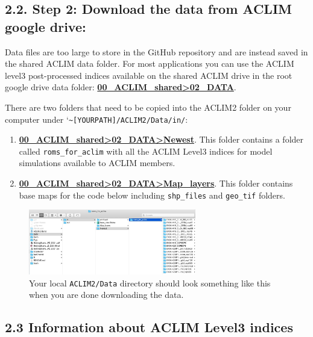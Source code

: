 \documentclass[
]{article}
\begin{document}
\hypertarget{step-2-download-the-data-from-aclim-google-drive}{%
\subsection{2.2. Step 2: Download the data from ACLIM google
drive:}\label{step-2-download-the-data-from-aclim-google-drive}}

Data files are too large to store in the GitHub repository and are
instead saved in the shared ACLIM data folder. For most applications you
can use the ACLIM level3 post-processed indices available on the shared
ACLIM drive in the root google drive data folder:
\href{https://drive.google.com/drive/u/0/folders/0Bx7wdZllbuF9eDJndkhCS2EwQUk}{\textbf{00\_ACLIM\_shared\textgreater02\_DATA}}.

There are two folders that need to be copied into the ACLIM2 folder on
your computer under
`\texttt{\textasciitilde{}{[}YOURPATH{]}/ACLIM2/Data/in/}:

\begin{enumerate}
\def\labelenumi{\arabic{enumi})}
\item
  \href{https://drive.google.com/drive/u/0/folders/0Bx7wdZllbuF9eDJndkhCS2EwQUk}{\textbf{00\_ACLIM\_shared\textgreater02\_DATA\textgreater Newest}}.
  This folder contains a folder called \texttt{roms\_for\_aclim} with
  all the ACLIM Level3 indices for model simulations available to ACLIM
  members.
\item
  \href{https://drive.google.com/drive/u/0/folders/0Bx7wdZllbuF9eDJndkhCS2EwQUk}{\textbf{00\_ACLIM\_shared\textgreater02\_DATA\textgreater Map\_layers}}.
  This folder contains base maps for the code below including
  \texttt{shp\_files} and \texttt{geo\_tif} folders.
\end{enumerate}

\begin{figure}
\centering
\includegraphics[width=0.65\textwidth,height=\textheight]{Figs/data_dir.jpg}
\caption{Your local \texttt{ACLIM2/Data} directory should look something
like this when you are done downloading the data.}
\end{figure}

\hypertarget{information-about-aclim-level3-indices}{%
\subsection{2.3 Information about ACLIM Level3
indices}\label{information-about-aclim-level3-indices}}
\end{document}
